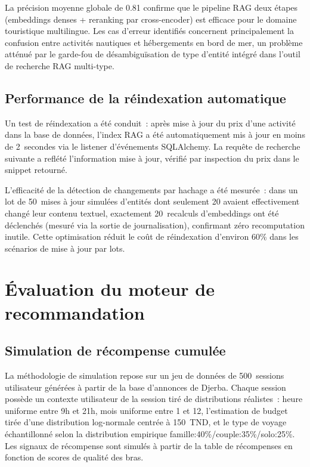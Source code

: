 La précision moyenne globale de 0.81 confirme que le pipeline RAG deux étapes
(embeddings denses + reranking par cross-encoder) est efficace pour le domaine touristique
multilingue. Les cas d'erreur identifiés concernent principalement la confusion entre
activités nautiques et hébergements en bord de mer, un problème atténué par le garde-fou
de désambiguïsation de type d'entité intégré dans l'outil de recherche RAG multi-type.


\subsection{Performance de la réindexation automatique}

Un test de réindexation a été conduit~: après mise à jour du prix d'une activité dans la base
de données, l'index RAG a été automatiquement mis à jour en moins de 2~secondes via le
listener d'événements SQLAlchemy. La requête de recherche suivante a reflété l'information
mise à jour, vérifié par inspection du prix dans le snippet retourné.

L'efficacité de la détection de changements par hachage a été mesurée~: dans un lot de
50~mises à jour simulées d'entités dont seulement 20 avaient effectivement changé leur
contenu textuel, exactement 20~recalculs d'embeddings ont été déclenchés (mesuré via la
sortie de journalisation), confirmant zéro recomputation inutile. Cette optimisation réduit
le coût de réindexation d'environ 60\% dans les scénarios de mise à jour par lots.

\section{Évaluation du moteur de recommandation}

\subsection{Simulation de récompense cumulée}

La méthodologie de simulation repose sur un jeu de données de 500~sessions utilisateur
générées à partir de la base d'annonces de Djerba. Chaque session possède un
contexte utilisateur de la session tiré de distributions réalistes~: heure uniforme entre 9h et 21h,
mois uniforme entre 1 et 12, l'estimation de budget tirée d'une distribution log-normale
centrée à 150~TND, et le type de voyage échantillonné selon la distribution empirique
famille:40\%/couple:35\%/solo:25\%. Les signaux de récompense sont simulés à partir de
la table de récompenses en fonction de scores de qualité des bras.

